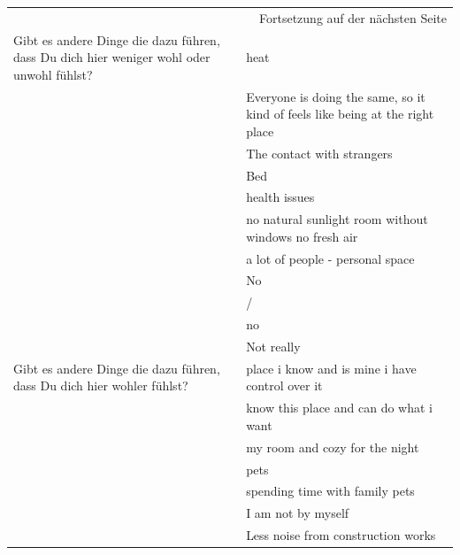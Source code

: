\begin{appendices}
\begin{longtable}{p{5.5cm}p{9.5cm}}
    \midrule
    \multicolumn{2}{r}{Fortsetzung auf der nächsten Seite}\\
    \endfoot
    
    \bottomrule
    \endlastfoot

    Gibt es andere Dinge die dazu führen, dass Du dich hier weniger wohl oder unwohl fühlst? & heat \\*
     & Everyone is doing the same, so it kind of feels like being at the right place \\*
     & The contact with strangers \\*
     & Bed \\*
     & health issues \\*
     & no natural sunlight room without windows no fresh air \\*
     & a lot of people - personal space \\*
     & No \\*
     & / \\*
     & no \\*
     & Not really \\
    \midrule
    \addlinespace
    Gibt es andere Dinge die dazu führen, dass Du dich hier wohler fühlst? & place i know and is mine i have control over it \\*
     & know this place and can do what i want \\*
     & my room and cozy for the night \\*
     & pets \\*
     & spending time with family pets \\*
     & I am not by myself \\*
     & Less noise from construction works \\
    \bottomrule
\end{longtable}




\end{appendices}